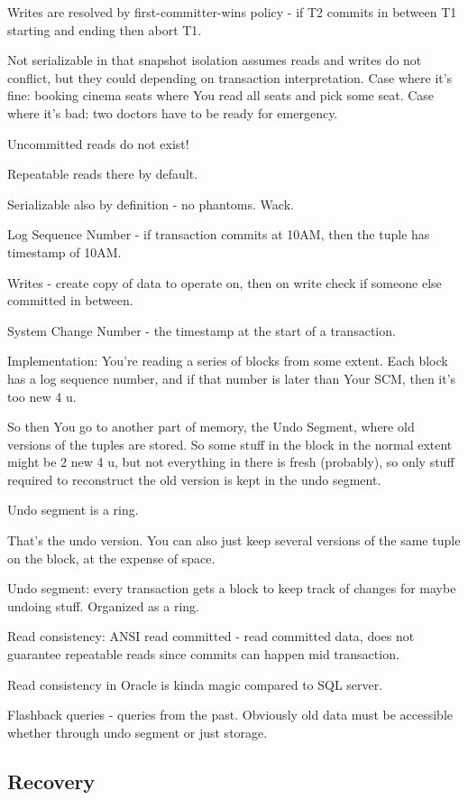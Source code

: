 \documentclass{article}
\begin{document}
		Writes are resolved by first-committer-wins policy - if T2 commits in between T1 starting and ending then abort T1.
		
		Not serializable in that snapshot isolation assumes reads and writes do not conflict, but they could depending on transaction interpretation. Case where it's fine: booking cinema seats where You read all seats and pick some seat. Case where it's bad: two doctors have to be ready for emergency.
		
		Uncommitted reads do not exist!
		
		Repeatable reads there by default.
		
		Serializable also by definition - no phantoms. Wack.
		
		Log Sequence Number - if transaction commits at 10AM, then the tuple has timestamp of 10AM. 
		
		Writes - create copy of data to operate on, then on write check if someone else committed in between.
		
		System Change Number - the timestamp at the start of a transaction.
		
		Implementation: You're reading a series of blocks from some extent. Each block has a log sequence number, and if that number is later than Your SCM, then it's too new 4 u. 
		
		So then You go to another part of memory, the Undo Segment, where old versions of the tuples are stored. So some stuff in the block in the normal extent might be 2 new 4 u, but not everything in there is fresh (probably), so only stuff required to reconstruct the old version is kept in the undo segment.
		
		Undo segment is a ring.
		
		That's the undo version. You can also just keep several versions of the same tuple on the block, at the expense of space.
		
		Undo segment: every transaction gets a block to keep track of changes for maybe undoing stuff. Organized as a ring.
		
		Read consistency: ANSI read committed - read committed data, does not guarantee repeatable reads since commits can happen mid transaction. 
		
		Read consistency in Oracle is kinda magic compared to SQL server.
		
		Flashback queries - queries from the past. Obviously old data must be accessible whether through undo segment or just storage.
		
	\subsection{Recovery}
	
\end{document}
